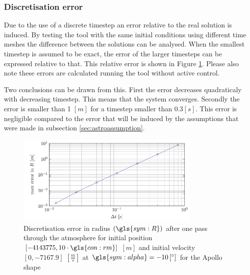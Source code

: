 \subsubsection{Discretisation error}
\label{sec:astrodisc}

Due to the use of a discrete timestep an error relative to the real solution is induced. By testing the tool with the same initial conditions using different time meshes the difference between the solutions can be analysed. When the smallest timestep is assumed to be exact, the error of the larger timesteps can be expressed relative to that. This relative error is shown in Figure \ref{fig:atmos_disc}. Please also note these errors are calculated running the tool without active control.

Two conclusions can be drawn from this. First the error decreases quadraticaly with decreasing timestep. This means that the system converges. Secondly the error is smaller than 1 $\left[m\right]$ for a timestep smaller than $0.3 \left[s\right]$. This error is negligible compared to the error that will be induced by the assumptions that were made in subsection \ref{sec:astroassumption}.



\begin{figure}[h]
	\centering
	\includegraphics[width=0.8\textwidth]{Figure/orbital_model/dicretization.pdf}
	\caption[Discretisation error in radius $\left(\gls{sym:R}\right)$ after one pass through the atmosphere for the rigid shape]{Discretisation error in radius $\left(\gls{sym:R}\right)$ after one pass through the atmosphere for initial position $\left[-4143775,10\cdot\gls{con:rm}\right]$ $\left[m\right]$ and initial velocity $\left[0,-7167.9\right]$ $\left[\frac{m}{s}\right]$ at $\gls{sym:alpha}=-10\left[^\circ\right]$ for the Apollo shape}
	\label{fig:atmos_disc}
\end{figure}

